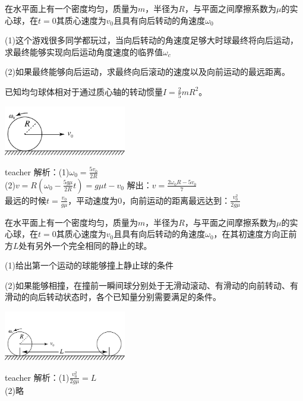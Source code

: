 \begin{example}
在水平面上有一个密度均匀，质量为$m$，半径为$R$，与平面之间摩擦系数为$\mu$的实心球，在$t=0$其质心速度为$v_0$且具有向后转动的角速度$\omega_0$

(1)这个游戏很多同学都玩过，当向后转动的角速度足够大时球最终将向后运动，求最终能够实现向后运动角度速度的临界值$\omega_c$

(2)如果最终能够向后运动，求最终向后滚动的速度以及向前运动的最远距离。

已知均匀球体相对于通过质心轴的转动惯量$I=\frac{2}{5}mR^2$。
\begin{flushright}
\includegraphics[width=0.4\textwidth]{images/rb-problem-4.pdf}
\end{flushright}
\begin{taggedblock}{teacher}
\noindent
解析：(1)$\omega_0=\frac{5v_0}{2R}$
\\(2)$v=R(\omega_0-\frac{5g\mu}{2R}t)=g\mu t-v_0$ 解出：$v=\frac{2\omega_0R-5v_0}{7}$
\\最远的时候$t=\frac{v_0}{g\mu}$，平动速度为0，向前运动的距离最远达到：$\frac{v_0^2}{2g\mu}$
\end{taggedblock}
\end{example}

\begin{example}
在水平面上有一个密度均匀，质量为$m$，半径为$R$，与平面之间摩擦系数为$\mu$的实心球，在$t=0$其质心速度为$v_0$且具有向后转动的角速度$\omega_0$，在其初速度方向正前方$L$处有另外一个完全相同的静止的球。

(1)给出第一个运动的球能够撞上静止球的条件

(2)如果能够相撞，在撞前一瞬间球分别处于无滑动滚动、有滑动的向前转动、有滑动的向后转动状态时，各个已知量分别需要满足的条件。
\begin{flushright}
\includegraphics[width=0.4\textwidth]{images/rb-problem-6.pdf}
\end{flushright}

\begin{taggedblock}{teacher}
\noindent
解析：(1)$\frac{v_0^2}{2g\mu}=L$
\\(2)略
\end{taggedblock}
\end{example}

